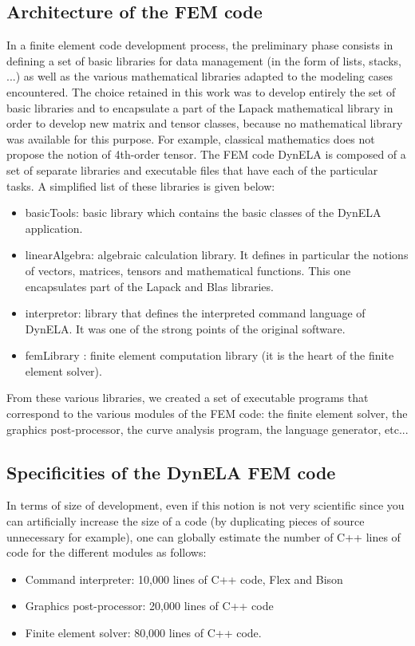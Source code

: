 \documentclass{article}
\begin{document}
\subsection{Architecture of the FEM code}

In a finite element code development process, the preliminary phase consists in defining a set of basic libraries for data management (in the form of lists, stacks, ...) as well as the various mathematical libraries adapted to the modeling cases encountered. The choice retained in this work was to develop entirely the set of basic libraries and to encapsulate a part of the Lapack \cite{Lapack:1999} mathematical library in order to develop new matrix and tensor classes, because no mathematical library was available for this purpose. For example, classical mathematics does not propose the notion of 4th-order tensor. The FEM code DynELA is composed of a set of separate libraries and executable files that have each of the particular tasks. A simplified list of these libraries is given below:
\begin{itemize}
\item basicTools: basic library which contains the basic classes of the DynELA application.
\item linearAlgebra: algebraic calculation library. It defines in particular the notions of vectors, matrices, tensors and mathematical functions. This one encapsulates part of the Lapack and Blas libraries.
\item interpretor: library that defines the interpreted command language of DynELA. It was one of the strong points of the original software.
\item femLibrary : finite element computation library (it is the heart of the finite element solver).
\end{itemize}
From these various libraries, we created a set of executable programs that correspond to the various modules of the FEM code: the finite element solver, the graphics post-processor, the curve analysis program, the language generator, etc...

\subsection{Specificities of the DynELA FEM code}
In terms of size of development, even if this notion is not very scientific since you can artificially increase the size of a code (by duplicating pieces of source unnecessary for example), one can globally estimate the number of C++ lines of code for the different modules as follows:
\begin{itemize}
\item Command interpreter: 10,000 lines of C++ code, Flex and Bison \cite{Levine:2009}
\item Graphics post-processor: 20,000 lines of C++ code
\item Finite element solver: 80,000 lines of C++ code.
\end{itemize}
\end{document}
